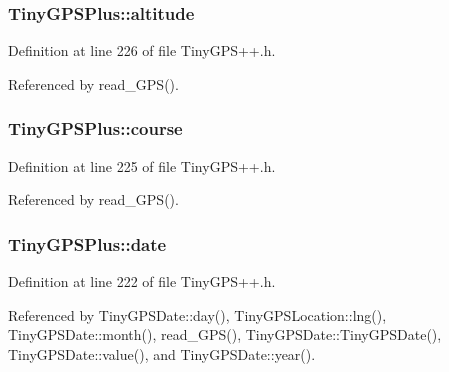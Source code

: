 \subsubsection[{\texorpdfstring{altitude}{altitude}}]{ Tiny\+G\+P\+S\+Plus\+::altitude}\hypertarget{class_tiny_g_p_s_plus_a0b3451a4ee75e5880ffd88c3038eacf8}{}\label{class_tiny_g_p_s_plus_a0b3451a4ee75e5880ffd88c3038eacf8}


Definition at line 226 of file Tiny\+G\+P\+S++.\+h.



Referenced by read\+\_\+\+G\+P\+S().

\subsubsection[{\texorpdfstring{course}{course}}]{ Tiny\+G\+P\+S\+Plus\+::course}\hypertarget{class_tiny_g_p_s_plus_ad7800d3decbe58e355f5229bba231868}{}\label{class_tiny_g_p_s_plus_ad7800d3decbe58e355f5229bba231868}


Definition at line 225 of file Tiny\+G\+P\+S++.\+h.



Referenced by read\+\_\+\+G\+P\+S().

\subsubsection[{\texorpdfstring{date}{date}}]{ Tiny\+G\+P\+S\+Plus\+::date}\hypertarget{class_tiny_g_p_s_plus_a83a70812b432d7f51c7c735bfe7be0f0}{}\label{class_tiny_g_p_s_plus_a83a70812b432d7f51c7c735bfe7be0f0}


Definition at line 222 of file Tiny\+G\+P\+S++.\+h.



Referenced by Tiny\+G\+P\+S\+Date\+::day(), Tiny\+G\+P\+S\+Location\+::lng(), Tiny\+G\+P\+S\+Date\+::month(), read\+\_\+\+G\+P\+S(), Tiny\+G\+P\+S\+Date\+::\+Tiny\+G\+P\+S\+Date(), Tiny\+G\+P\+S\+Date\+::value(), and Tiny\+G\+P\+S\+Date\+::year().

